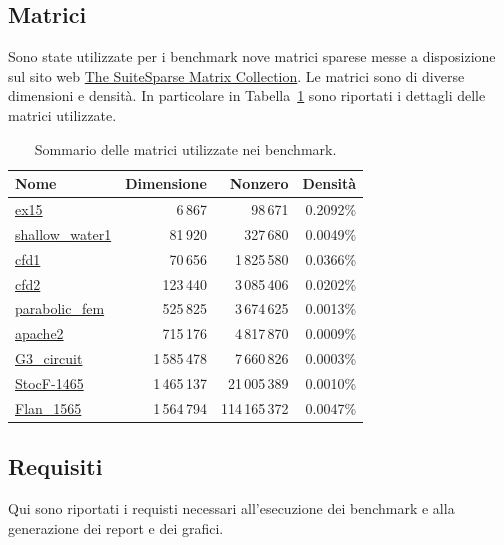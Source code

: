 \documentclass[a4paper, 12pt]{article}
\begin{document}
\subsection{Matrici}
Sono state utilizzate per i benchmark nove matrici sparese messe a disposizione
sul sito web \href{https://sparse.tamu.edu/}{The SuiteSparse Matrix Collection}.
Le matrici sono di diverse dimensioni e densità. In particolare in
Tabella~\ref{tab:matrices} sono riportati i dettagli delle matrici utilizzate.

\begin{table}[ht]
\centering

\begin{tabular}{@{}lrrr@{}}
\toprule
\textbf{Nome}
& \textbf{Dimensione} & \textbf{Nonzero} & \textbf{Densità} \\
\midrule
\href{https://sparse.tamu.edu/FIDAP/ex15}{ex15}
& 6\,867         & 98\,671          & 0.2092\%         \\
\href{https://sparse.tamu.edu/MaxPlanck/shallow_water1}{shallow\_water1}
& 81\,920        & 327\,680         & 0.0049\%         \\
\href{https://sparse.tamu.edu/Rothberg/cfd1}{cfd1}
& 70\,656        & 1\,825\,580      & 0.0366\%         \\
\href{https://sparse.tamu.edu/Rothberg/cfd2}{cfd2}
& 123\,440       & 3\,085\,406      & 0.0202\%         \\
\href{https://sparse.tamu.edu/Wissgott/parabolic_fem}{parabolic\_fem}
& 525\,825       & 3\,674\,625      & 0.0013\%         \\
\href{https://sparse.tamu.edu/GHS_psdef/apache2}{apache2}
& 715\,176       & 4\,817\,870      & 0.0009\%         \\
\href{https://sparse.tamu.edu/AMD/G3_circuit}{G3\_circuit}
& 1\,585\,478    & 7\,660\,826      & 0.0003\%         \\
\href{https://sparse.tamu.edu/Janna/StocF-1465}{StocF-1465}
& 1\,465\,137    & 21\,005\,389     & 0.0010\%         \\
\href{https://sparse.tamu.edu/Janna/Flan_1565}{Flan\_1565}
& 1\,564\,794    & 114\,165\,372    & 0.0047\%         \\
\bottomrule
\end{tabular}%

\caption{Sommario delle matrici utilizzate nei benchmark.}
\label{tab:matrices}
\end{table}

\subsection{Requisiti}
Qui sono riportati i requisti necessari all'esecuzione dei benchmark e alla
generazione dei report e dei grafici.
\end{document}
